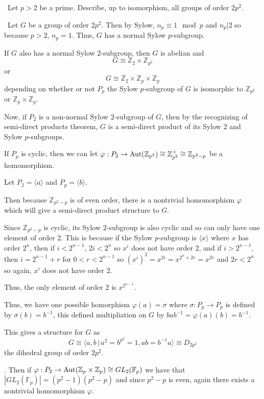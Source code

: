 \documentclass[12pt]{Qual}
\begin{document}
\begin{problem} $\,$
Let $p>2$ be a prime. Describe, up to isomorphism, all groups of order $2p^2$.
\end{problem}


\begin{solution}$\,$
Let $G$ be a group of order $2p^2$. Then by Sylow, $n_p\equiv 1\mod p$ and $n_p|2$ so because $p>2$, $n_p=1$. Thus, $G$ has a normal Sylow $p$-subgroup.

 If $G$ also has a normal Sylow $2$-subgroup, then $G$ is abelian and $$G\cong\mathbb{Z}_2\times\mathbb{Z}_{p^2}$$ or $$G\cong\mathbb{Z}_2\times\mathbb{Z}_p\times\mathbb{Z}_p$$ depending on whether or not $P_p$ the Sylow $p$-subgroup of $G$ is isomorphic to $\mathbb{Z}_{p^2}$ or $\mathbb{Z}_p\times\mathbb{Z}_p$.

Now, if $P_2$ is a non-normal Sylow $2$-subgroup of $G$, then by the recognizing of semi-direct products theorem, $G$ is a semi-direct product of its Sylow $2$ and Sylow $p$-subgroups.

 If $P_p$ is cyclic, then we can let $\varphi:P_2\to\text{Aut}(\mathbb{Z}_{p^2})\cong\mathbb{Z}_{p^2}^\times\cong\mathbb{Z}_{p^2-p}$ be a homomorphism.

Let $P_2=\langle a\rangle$ and $P_p=\langle b\rangle.$

Then because $\mathbb{Z}_{p^2-p}$ is of even order, there is a nontrivial homomorphism $\varphi$ which will give a semi-direct product structure to $G.$

Since $\mathbb{Z}_{p^2-p}$ is cyclic, its Sylow $2$-subgroup is also cyclic and so can only have one element of order $2$. This is because if the Sylow $p$-subgroup is $\langle x\rangle$ where $x$ has order $2^n$, then if $i<2^{n-1}$, $2i<2^n$ so $x^i$ does not have order $2$, and if $i>2^{n-1}$, then $i=2^{n-1}+r$ for $0<r<2^{n-1}$ so $(x^i)^2=x^{2i}=x^{2^n+2r}=x^{2r}$ and $2r<2^n$ so again, $x^i$ does not have order $2$.

Thus, the only element of order $2$ is $x^{2^{n-1}}$.

Thus, we have one possible homorphism $\varphi(a)=\sigma$ where $\sigma:P_p\to P_p$ is defined by $\sigma(b)=b^{-1}$, this defined multipliation on $G$ by $bab^{-1}=\varphi(a)(b)=b^{-1}$.

This gives a structure for $G$ as $$G\cong\langle a,b\,|\,a^2=b^{p^2}=1,ab=b^{-1}a\rangle\cong D_{2p^2}$$ the dihedral group of order $2p^2$.

. Then if $\varphi:P_2\to\text{Aut}(\mathbb{Z}_p\times\mathbb{Z}_p)\cong GL_2(\mathbb{F}_p)$ we have that $|GL_2(\mathbb{F}_p)|=(p^2-1)(p^2-p)$ and since $p^2-p$ is even, again there exists a nontrivial homomorphism $\varphi.$


\end{solution}
\end{document}
